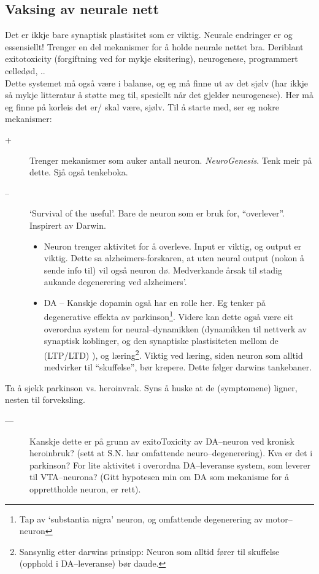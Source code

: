 \subsection{Vaksing av neurale nett}
Det er ikkje bare synaptisk plastisitet som er viktig. Neurale endringer er og essensiellt! Trenger en del mekanismer for å holde neurale nettet bra. Deriblant exitotoxicity (forgiftning ved for mykje eksitering), neurogenese, programmert celledød, .. \\
Dette systemet må også være i balanse, og eg må finne ut av det sjølv (har ikkje så mykje litteratur å støtte meg til, spesiellt når det gjelder neurogenese). Her må eg finne på korleis det er/ skal være, sjølv.
Til å starte med, ser eg nokre mekanismer:
	\begin{description} 
		\item [+] Trenger mekanismer som auker antall neuron. \emph{NeuroGenesis}. Tenk meir på dette. Sjå også tenkeboka.
		\item [--] `Survival of the useful'. Bare de neuron som er bruk for, ``overlever''. Inspirert av Darwin.
			\begin{itemize} 
				\item Neuron trenger aktivitet for å overleve. Input er viktig, og output er viktig. Dette sa alzheimers-forskaren, at uten neural output (nokon å sende info til) vil også neuron dø. Medverkande årsak til stadig aukande degenerering ved alzheimers'.
				\item DA -- Kanskje dopamin også har en rolle her. Eg tenker på degenerative effekta av parkinson\footnote{Tap av `substantia nigra' neuron, og omfattende degenerering av motor--neuron}. Videre kan dette også være eit overordna system for neural--dynamikken (dynamikken til nettverk av synaptisk koblinger, og den synaptiske plastisiteten mellom de (LTP/LTD) ), og læring\footnote{Sansynlig etter darwins prinsipp: Neuron som alltid fører til skuffelse (opphold i DA--leveranse) bør daude.}. Viktig ved læring, siden neuron som alltid medvirker til ``skuffelse'', bør krepere. Dette følger darwins tankebaner.
			\end{itemize}
	\end{description}
Ta å sjekk parkinson vs. heroinvrak. Syns å huske at de (symptomene) ligner, nesten til forveksling. \\
\begin{description}
	\item[---] Kanskje dette er på grunn av exitoToxicity av DA--neuron ved kronisk heroinbruk? (sett at S.N. har omfattende neuro--degenerering).
Kva er det i parkinson? For lite aktivitet i overordna DA--leveranse system, som leverer til VTA--neurona? (Gitt hypotesen min om DA som mekanisme for å opprettholde neuron, er rett).
\end{description}

